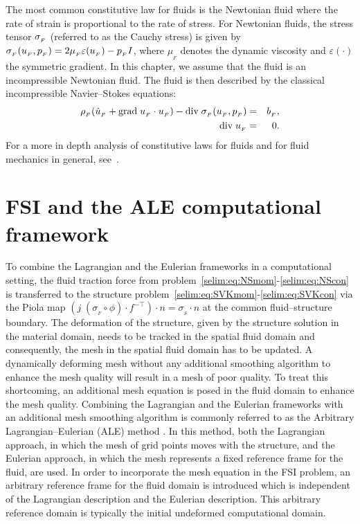 The most common constitutive law for fluids is the Newtonian fluid
where the rate of strain is proportional to the rate of stress. For
Newtonian fluids, the stress tensor $\sigma_{_{F}}$ (referred to as the
Cauchy stress) is given by $\sigma_{_{F}}(u_{_{F}}, p_{_{F}}) = 2\mu_{_{F}}\varepsilon (u_{_{F}}) -
p_{_{F}} I$, where $\mu_{_{F}}$ denotes the dynamic viscosity and
$\varepsilon(\cdot)$ the symmetric gradient. In this chapter, we
assume that the fluid is an incompressible Newtonian fluid. The fluid
is then described by the classical incompressible Navier--Stokes
equations:
\begin{eqnarray}
  \label{selim:eq:NSmom}
      \rho_{_{F}}(\dot{u}_{_{F}} + \textrm{grad}\;u_{_{F}}\cdot u_{_{F}})- \textrm{div}\;
      \sigma_{_{F}}(u_{_{F}}, p_{_{F}}) &=& b_{_{F}},\\
  \label{selim:eq:NScon}
      \textrm{div}\; u_{_{F}} &=& 0.
\end{eqnarray}
For a more in depth analysis of constitutive laws for fluids and for
fluid mechanics in general, see~\citet{Batchelor1967,Panton1984,
  WeltyWicksWilson2001}.

\section{FSI and the ALE computational framework}
\label{selim:sec:ale}
To combine the Lagrangian and the Eulerian frameworks in a
computational setting, the fluid traction force from
problem~\eqref{selim:eq:NSmom}-\eqref{selim:eq:NScon} is transferred
to the structure
problem~\eqref{selim:eq:SVKmom}-\eqref{selim:eq:SVKcon} via the Piola
map $(j\; (\sigma_{_{F}}\circ \phi)\cdot f^{-\top})\cdot n =
\sigma_{_{S}}\cdot n$ at the common fluid--structure boundary.
The deformation of the structure, given by the structure solution in
the material domain, needs to be tracked in the spatial fluid domain
and consequently, the mesh in the spatial fluid domain has to be
updated. A dynamically deforming mesh without any additional smoothing
algorithm to enhance the mesh quality will result in a mesh of poor
quality. To treat this shortcoming, an additional mesh equation is
posed in the fluid domain to enhance the mesh quality. Combining the
Lagrangian and the Eulerian frameworks with an additional mesh
smoothing algorithm is commonly referred to as the Arbitrary
Lagrangian--Eulerian (ALE) method \citep{DoneaGiulianiHalleux1982,
  DoneaHuertaPonthotEtAl2004}.  In this method, both the Lagrangian
approach, in which the mesh of grid points moves with the structure,
and the Eulerian approach, in which the mesh represents a fixed
reference frame for the fluid, are used. In order to incorporate the
mesh equation in the FSI problem, an arbitrary reference frame for the
fluid domain is introduced which is independent of the Lagrangian
description and the Eulerian description. This arbitrary reference
domain is typically the initial undeformed computational domain.

